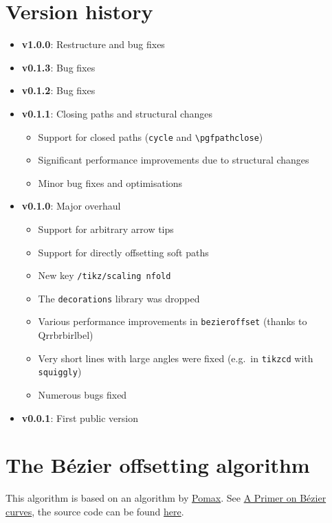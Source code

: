 \documentclass[12pt,a4paper]{article}
\theoremstyle{definition}
\begin{document}
\newpage
\section{Version history}

\begin{itemize}
  \item \textbf{v1.0.0}: Restructure and bug fixes
  \item \textbf{v0.1.3}: Bug fixes
  \item \textbf{v0.1.2}: Bug fixes
  \item \textbf{v0.1.1}: Closing paths and structural changes
  \begin{itemize}
    \item Support for closed paths (\texttt{cycle} and \verb|\pgfpathclose|)
    \item Significant performance improvements due to structural changes
    \item Minor bug fixes and optimisations
\end{itemize}
  \item \textbf{v0.1.0}: Major overhaul
  \begin{itemize}
    \item Support for arbitrary arrow tips
    \item Support for directly offsetting soft paths
    \item New key \texttt{/tikz/scaling nfold}
    \item The \texttt{decorations} library was dropped
    \item Various performance improvements in \texttt{bezieroffset} (thanks to \hbox{Qrrbrbirlbel})
    \item Very short lines with large angles were fixed (e.g.\ in \texttt{tikzcd} with \texttt{squiggly})
    \item Numerous bugs fixed
  \end{itemize}
  \item \textbf{v0.0.1}: First public version
\end{itemize}

\appendix
\newpage
\section{The Bézier offsetting algorithm}

This algorithm is based on an algorithm by \href{https://github.com/Pomax/}{Pomax}. See \href{https://pomax.github.io/bezierinfo/#offsetting}{A Primer on Bézier curves}, the source code can be found \href{https://github.com/Pomax/bezierinfo/blob/bcfce2149fa5e5540a2a2605986adab3b2a9a3bf/js/graphics-element/lib/bezierjs/bezier.js}{here}.
\end{document}
